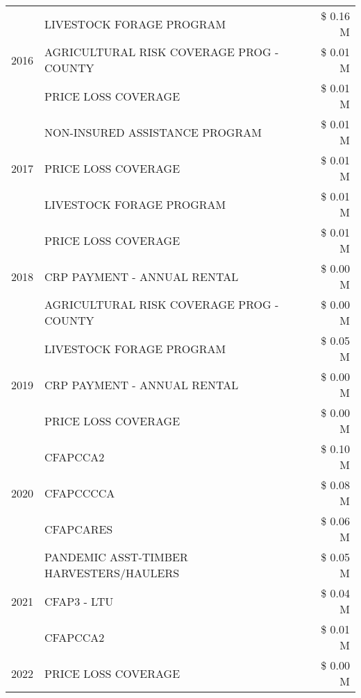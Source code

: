 \begin{tabular}{llr}
\cline{1-3}
\multirow[t]{3}{*}{2016} & LIVESTOCK FORAGE PROGRAM & \$ 0.16 M \\
 & AGRICULTURAL RISK COVERAGE PROG - COUNTY & \$ 0.01 M \\
 & PRICE LOSS COVERAGE & \$ 0.01 M \\
\cline{1-3}
\multirow[t]{3}{*}{2017} & NON-INSURED ASSISTANCE PROGRAM & \$ 0.01 M \\
 & PRICE LOSS COVERAGE & \$ 0.01 M \\
 & LIVESTOCK FORAGE PROGRAM & \$ 0.01 M \\
\cline{1-3}
\multirow[t]{3}{*}{2018} & PRICE LOSS COVERAGE & \$ 0.01 M \\
 & CRP PAYMENT - ANNUAL RENTAL & \$ 0.00 M \\
 & AGRICULTURAL RISK COVERAGE PROG - COUNTY & \$ 0.00 M \\
\cline{1-3}
\multirow[t]{3}{*}{2019} & LIVESTOCK FORAGE PROGRAM & \$ 0.05 M \\
 & CRP PAYMENT - ANNUAL RENTAL & \$ 0.00 M \\
 & PRICE LOSS COVERAGE & \$ 0.00 M \\
\cline{1-3}
\multirow[t]{3}{*}{2020} & CFAPCCA2 & \$ 0.10 M \\
 & CFAPCCCCA & \$ 0.08 M \\
 & CFAPCARES & \$ 0.06 M \\
\cline{1-3}
\multirow[t]{3}{*}{2021} & PANDEMIC ASST-TIMBER HARVESTERS/HAULERS & \$ 0.05 M \\
 & CFAP3 - LTU & \$ 0.04 M \\
 & CFAPCCA2 & \$ 0.01 M \\
\cline{1-3}
2022 & PRICE LOSS COVERAGE & \$ 0.00 M \\
\cline{1-3}
\bottomrule
\end{tabular}

